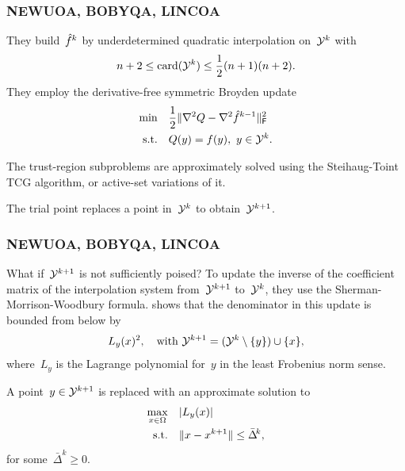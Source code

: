 \documentclass{polyu-presentation}
\newcommand{\objm}[1][]{\hat{f}\ifthenelse{\equal{#1}{}}{}{^{#1}}}
\newcommand{\xpt}[1][]{\mathcal{Y}\ifthenelse{\equal{#1}{}}{}{^{#1}}}
\begin{document}
\begin{frame}
    \frametitle{NEWUOA, BOBYQA, LINCOA~\parencite{Powell_2006,Powell_2009,Powell_2015}}

	They build~$\objm[k]$ by \alert{underdetermined quadratic interpolation} on~$\xpt[k]$ with
    \begin{equation*}
        n + 2 \le \card(\xpt[k]) \le \frac{1}{2} (n + 1) (n + 2).
    \end{equation*}
    They employ the \alert{derivative-free symmetric Broyden update}
    \begin{align*}
        \min        & \quad \frac{1}{2} \norm{\nabla^2 Q - \nabla^2 \objm[k - 1]}_{\mathsf{F}}^2\\
        \text{s.t.} & \quad Q(y) = f(y), ~ y \in \xpt[k].
    \end{align*}

    \begin{block}{}
        The \alert{trust-region subproblems} are approximately solved using the \alert{Steihaug-Toint TCG} algorithm, or active-set variations of it.
    \end{block}

    \medskip

    The trial point \alert{replaces} a point in~$\xpt[k]$ to obtain~$\xpt[k + 1]$.
\end{frame}

\begin{frame}
    \frametitle{NEWUOA, BOBYQA, LINCOA~\parencite{Powell_2006,Powell_2009,Powell_2015}}

    \begin{block}{What if~$\xpt[k + 1]$ is not sufficiently poised?}
        To update the \alert{inverse} of the coefficient matrix of the interpolation system from~$\xpt[k + 1]$ to~$\xpt[k]$, they use the \alert{Sherman-Morrison-Woodbury formula}.
        \cite{Powell_2004c} shows that the denominator in this update is bounded from below by
        \begin{equation*}
            L_y(x)^2, \quad \text{with~$\xpt[k + 1] = (\xpt[k] \setminus \set{y}) \cup \set{x}$},
        \end{equation*}
        where~$L_y$ is the \alert{Lagrange polynomial} for~$y$ in the least Frobenius norm sense.
    \end{block}

    \smallskip

    A point~$y \in \xpt[k + 1]$ is \alert{replaced} with an approximate solution to
    \begin{align*}
        \max_{x \in \Omega} & \quad \lvert L_y(x)\rvert\\
        \text{s.t.}         & \quad \lVert x - x^{k + 1}\rVert \le \bar{\Delta}^{\! k},
    \end{align*}
    for some~$\bar{\Delta}^{\! k} \ge 0$.
\end{frame}
\end{document}
